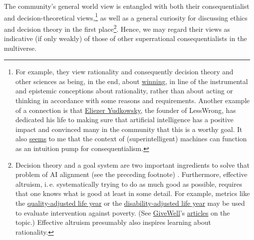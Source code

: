 The community's general world view is entangled with both their
consequentialist and decision-theoretical views,\footnote{For example,
  they view rationality and consequently decision theory and other
  sciences as being, in the end, about
  \href{http://lesswrong.com/lw/7i/rationality_is_systematized_winning/}{winning},
  in line of the instrumental and epistemic conceptions about
  rationality, rather than about acting or thinking in accordance with
  some reasons and requirements. Another example of a connection is that
  \href{https://en.wikipedia.org/wiki/Eliezer_Yudkowsky}{Eliezer
  Yudkowsky}, the founder of LessWrong, has dedicated his life to
  making sure that artificial intelligence has a positive impact and
  convinced many in the community that this is a worthy goal. It also
  \href{http://reducing-suffering.org/machine-ethics-and-preference-utilitarianism/\#Ethical_considerations}{seems}
  to me that the context of (superintelligent) machines can function as
  an intuition pump for consequentialism.} as well as a general
curiosity for discussing ethics and decision theory in the first
place\footnote{Decision theory and a goal system are two important
  ingredients to solve that problem of AI alignment (see the preceding
  footnote) \parencite{Soares2015-is,Bostrom2014-pc}.
  Furthermore, effective altruism, i.\,e. systematically trying to do as
  much good as possible, requires that one knows what is good at least
  in some detail. For example, metrics like the
  \href{https://en.wikipedia.org/wiki/Quality-adjusted_life_year}{quality-adjusted
  life year} or the
  \href{https://en.wikipedia.org/wiki/Disability-adjusted_life_year}{disability-adjusted
  life year} may be used to evaluate intervention against poverty. (See
  \href{http://www.givewell.org/}{GiveWell}'s
  \href{http://blog.givewell.org/2008/08/07/disability-adjusted-life-years-introduction/}{articles}
  on the topic.) Effective altruism presumably also inspires learning
  about rationality.}. Hence, we may regard their views as indicative
(if only weakly) of those of other superrational consequentialists in
the multiverse.

